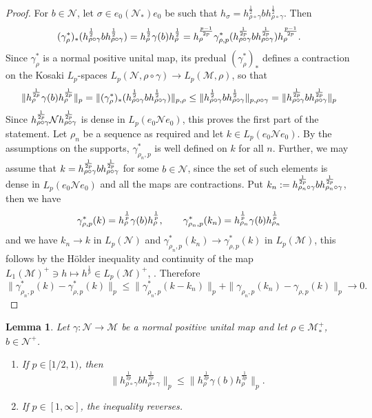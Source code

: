 \documentclass[12pt]{article}
\newtheorem{lemma}[theorem]{Lemma}
\theoremstyle{definition}
\theoremstyle{remark}
\numberwithin{equation}{section}
\def\Me{\mathcal M}
\def\Ne{\mathcal N}
\begin{document}
\begin{proof} For $b\in \Ne$, let $\sigma\in e_0 (\Ne_*)e_0$ be such that
$h_\sigma=h_{\rho\circ\gamma}^{\frac12}b h_{\rho\circ\gamma}^{\frac12}$. Then
\[
(\gamma^*_\rho)_*(h_{\rho\circ\gamma}^{\frac12}b
h_{\rho\circ\gamma}^{\frac12})=h_\rho^{\frac12}\gamma(b)h_\rho^{\frac12}=h_\rho^{p-1\over
2p}\gamma^*_{\rho,p}(h_{\rho\circ\gamma}^{1\over 2p}bh_{\rho\circ\gamma}^{1\over
2p})h_\rho^{p-1\over 2p}.
\]
Since $\gamma^*_\rho$ is a normal positive unital map, its predual $(\gamma^*_\rho)_*$
defines  a contraction on the Kosaki $L_p$-spaces  $L_p(\Ne,\rho\circ\gamma)\to L_p(\Me,\rho)$, so that 
\[
\|h_\rho^{1\over 2p}\gamma(b) h_\rho^{1\over 2p}\|_p=\|(\gamma^*_\rho)_*(h_{\rho\circ\gamma}^{\frac12}b
h_{\rho\circ\gamma}^{\frac12})\|_{p,\rho}\le \|h_{\rho\circ\gamma}^{\frac12}b
h_{\rho\circ\gamma}^{\frac12}\|_{p,\rho\circ\gamma}=\|h_{\rho\circ\gamma}^{1\over 2p}b
h_{\rho\circ\gamma}^{1\over 2p}\|_p
\]
Since $h_{\rho\circ\gamma}^{1\over 2p}\Ne h^{1\over
2p}_{\rho\circ\gamma}$ is dense in $L_p(e_0 \Ne e_0)$, this proves the first part of the
statement.  Let $\rho_n$ be a sequence as required and let $k\in L_p(e_0 \Ne e_0)$. By the
assumptions on the supports, $\gamma^*_{\rho_n,p}$ is well defined on $k$ for all $n$.
Further, we may assume that $k=h_{\rho\circ\gamma}^{1\over 2p}b
h_{\rho\circ\gamma}^{1\over 2p}$ for some $b\in \Ne$, since the set of such elements is
dense in $L_p(e_0 \Ne e_0)$ and all the maps are contractions. 
Put $k_n:=h_{\rho_n\circ\gamma}^{1\over 2p}b
h_{\rho_n\circ\gamma}^{1\over 2p}$, then we have
\[
\gamma^*_{\rho,p}(k)=h_\rho^{1\over p}\gamma(b)h_\rho^{1\over p},\qquad
\gamma^*_{\rho_n,p}(k_n)= h_{\rho_n}^{1\over p}\gamma(b)h_{\rho_n}^{1\over p}
\]
and we have $k_n\to k$ in $L_p(\Ne)$ and  $\gamma^*_{\rho_n,p}(k_n)\to
\gamma^*_{\rho,p}(k)$ in $L_p(\Me)$, this follows by the H\"older inequality and continuity of the map
$L_1(\Me)^+\ni h\mapsto h^{\frac1p}\in L_p(\Me)^+$, \cite{kosaki1984applicationsuc}.
Therefore
\[
\|\gamma^*_{\rho_n,p}(k)-\gamma^*_{\rho,p}(k)\|_p\le
\|\gamma^*_{\rho_n,p}(k-k_n)\|_p+\|\gamma_{\rho_n,p}(k_n)-\gamma_{\rho,p}(k)\|_p\to 0.
\]


\end{proof}


\begin{lemma}\label{lemma:dpi} Let $\gamma:\Ne\to \Me$ be a normal positive unital map and
let $\rho\in \Me_*^+$, $b\in \Ne^+$. 
\begin{enumerate}
\item[(i)]  If $p\in [1/2,1)$, then 
\[
\|h_{\rho\circ\gamma}^{\frac{1}{2p}}bh_{\rho\circ\gamma}^{\frac{1}{2p}}\|_p\le
\|h_{\rho}^{\frac{1}{2p}}\gamma(b)h_{\rho}^{\frac{1}{2p}}\|_p.
\]

\item[(ii)]  If $p\in [1,\infty]$, the inequality reverses.

\end{enumerate}


\end{lemma}
\end{document}
